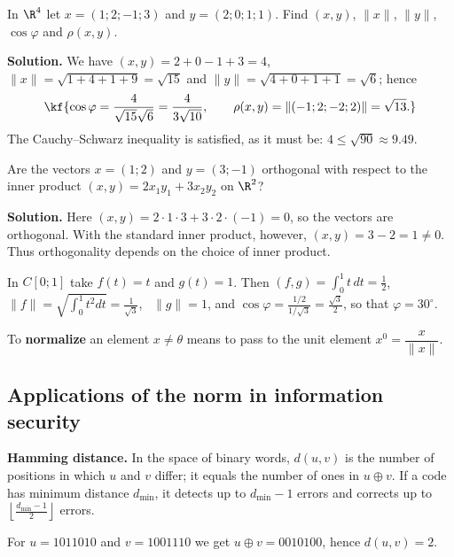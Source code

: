 \begin{misol}
In $\R^4$ let $x=(1;2;-1;3)$ and $y=(2;0;1;1)$. Find $(x,y)$, $\|x\|$, $\|y\|$,
$\cos\varphi$ and $\rho(x,y)$.

\textbf{Solution.} We have $(x,y)=2+0-1+3=4$, \ $\|x\|=\sqrt{1+4+1+9}=\sqrt{15}$ and
$\|y\|=\sqrt{4+0+1+1}=\sqrt6$; hence
\[\kf{\cos\varphi=\frac{4}{\sqrt{15}\sqrt6}=\frac{4}{3\sqrt{10}},\qquad
\rho(x,y)=\|(-1;2;-2;2)\|=\sqrt{13}.}\]
The Cauchy–Schwarz inequality is satisfied, as it must be: $4\leq\sqrt{90}\approx9.49$.
\end{misol}

\begin{misol}
Are the vectors $x=(1;2)$ and $y=(3;-1)$ orthogonal with respect to the inner
product $(x,y)=2x_1y_1+3x_2y_2$ on $\R^2$?

\textbf{Solution.} Here $(x,y)=2\cdot1\cdot3+3\cdot2\cdot(-1)=0$, so the vectors are
orthogonal. With the standard inner product, however, $(x,y)=3-2=1\neq0$.
Thus orthogonality depends on the choice of inner product.
\end{misol}

\begin{misol}
In $C[0;1]$ take $f(t)=t$ and $g(t)=1$. Then
$(f,g)=\int_0^1t\,dt=\frac12$, \ $\|f\|=\sqrt{\int_0^1t^2dt}=\frac{1}{\sqrt3}$, \
$\|g\|=1$, and $\cos\varphi=\frac{1/2}{1/\sqrt3}=\frac{\sqrt3}{2}$, so that $\varphi=30^\circ$.
\end{misol}

\begin{tarif}
To \textbf{normalize} an element $x\neq\theta$ means to pass to the unit element
$x^0=\dfrac{x}{\|x\|}$.
\end{tarif}

\subsection{Applications of the norm in information security}

\textbf{Hamming distance.} In the space of binary words, $d(u,v)$ is the number of
positions in which $u$ and $v$ differ; it equals the number of ones in $u\oplus v$.
If a code has minimum distance $d_{\min}$, it detects up to $d_{\min}-1$ errors
and corrects up to $\left\lfloor\frac{d_{\min}-1}{2}\right\rfloor$ errors.

\begin{misol}
For $u=1011010$ and $v=1001110$ we get $u\oplus v=0010100$, hence $d(u,v)=2$.
\end{misol}

